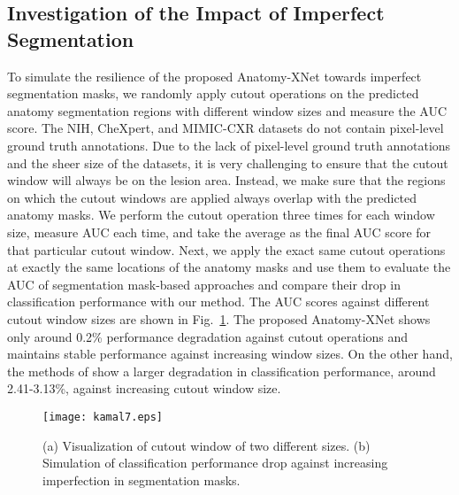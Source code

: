 \documentclass[journal]{IEEEtran}
\begin{document}
\subsection{Investigation of the Impact of Imperfect Segmentation}
To simulate the resilience of the proposed Anatomy-XNet towards imperfect segmentation masks, we randomly apply cutout operations\cite{Devries2017ImprovedRO} on the predicted anatomy segmentation regions with different window sizes and measure the AUC score. The NIH, CheXpert, and MIMIC-CXR datasets do not contain pixel-level ground truth annotations. Due to the lack of pixel-level ground truth annotations and the sheer size of the datasets, it is very challenging to ensure that the cutout window will always be on the lesion area. Instead, we make sure that the regions on which the cutout windows are applied always overlap with the predicted anatomy masks. We perform the cutout operation three times for each window size, measure AUC each time, and take the average as the final AUC score for that particular cutout window. Next, we apply the exact same cutout operations at exactly the same locations of the anatomy masks and use them to evaluate the AUC of segmentation mask-based approaches \cite{XU202196, Keidar2021, ARIASGARZON2021100138} and compare their drop in classification performance with our method. The AUC scores against different cutout window sizes are shown in Fig.~\ref{performance_drop_simulation_nih}. The proposed Anatomy-XNet shows only around 0.2\% performance degradation against cutout operations and maintains stable performance against increasing window sizes. On the other hand, the methods of \cite{Keidar2021, ARIASGARZON2021100138, XU202196} show a larger degradation in classification performance, around 2.41-3.13\%, against increasing cutout window size.
\begin{figure}[t]
    \centering
	\texttt{[image: kamal7.eps]}
    \caption{(a) Visualization of cutout window of two different sizes. (b) Simulation of classification performance drop against increasing imperfection in segmentation masks.}
    \label{performance_drop_simulation_nih}
\end{figure}
\end{document}
